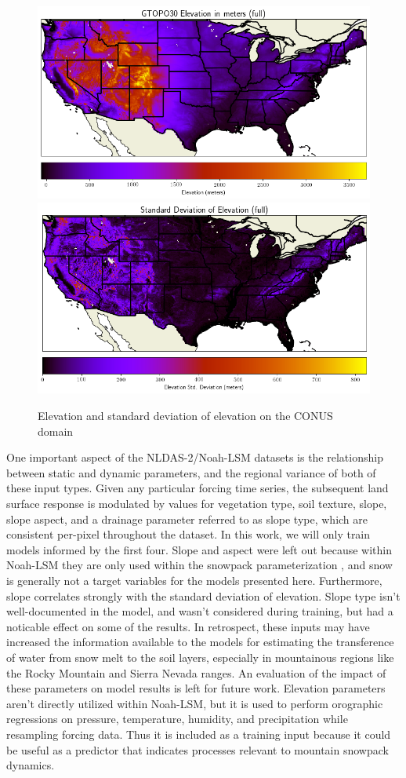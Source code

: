\begin{figure}[hp!]
    \centering
    \includegraphics[width=.85\linewidth,draft=false]{figures/static_elev_full.png}
    \includegraphics[width=.85\linewidth,draft=false]{figures/static_elev-stdev_full.png}
    \caption{Elevation and standard deviation of elevation on the CONUS domain}
    \label{static-elevation}
\end{figure}

One important aspect of the NLDAS-2/Noah-LSM datasets is the relationship between static and dynamic parameters, and the regional variance of both of these input types. Given any particular forcing time series, the subsequent land surface response is modulated by values for vegetation type, soil texture, slope, slope aspect, and a drainage parameter referred to as slope type, which are consistent per-pixel throughout the dataset. In this work, we will only train models informed by the first four. Slope and aspect were left out because within Noah-LSM they are only used within the snowpack parameterization \citep{barlage_noah_2010}, and snow is generally not a target variables for the models presented here. Furthermore, slope correlates strongly with the standard deviation of elevation. Slope type isn't well-documented in the model, and wasn't considered during training, but had a noticable effect on some of the results. In retrospect, these inputs may have increased the information available to the models for estimating the transference of water from snow melt to the soil layers, especially in mountainous regions like the Rocky Mountain and Sierra Nevada ranges. An evaluation of the impact of these parameters on model results is left for future work. Elevation parameters aren't directly utilized within Noah-LSM, but it is used to perform orographic regressions on pressure, temperature, humidity, and precipitation while resampling forcing data. Thus it is included as a training input because it could be useful as a predictor that indicates processes relevant to mountain snowpack dynamics.

